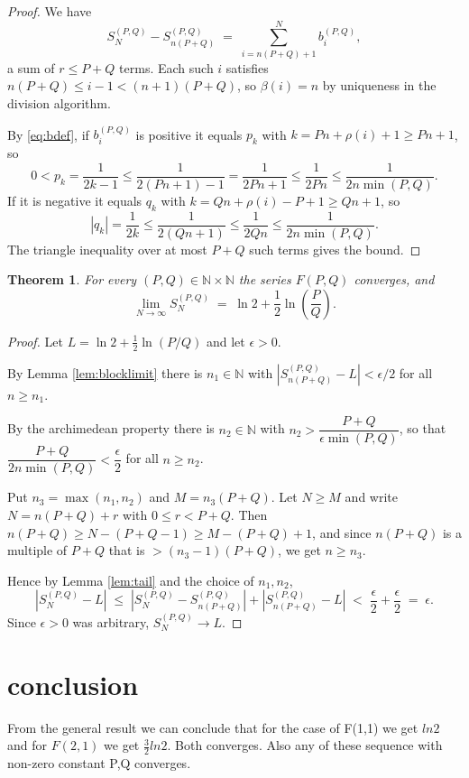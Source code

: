 \documentclass[11pt]{article}
\newtheorem{theorem}{Theorem}
\begin{document}
\begin{proof}
We have
\[
S_N^{(P,Q)} - S_{n(P+Q)}^{(P,Q)} \;=\; \sum_{i = n(P+Q)+1}^{N} b_i^{(P,Q)} ,
\]
a sum of $r \le P+Q$ terms. Each such $i$ satisfies $n(P+Q) \le i - 1 < (n+1)(P+Q)$,
so $\beta(i) = n$ by uniqueness in the division algorithm.

By \eqref{eq:bdef}, if $b_i^{(P,Q)}$ is positive it equals $p_k$ with
$k = Pn + \rho(i) + 1 \ge Pn+1$, so
\[
0 < p_k = \frac{1}{2k-1} \le \frac{1}{2(Pn+1)-1} = \frac{1}{2Pn+1}
\le \frac{1}{2Pn} \le \frac{1}{2n\min(P,Q)} .
\]
If it is negative it equals $q_k$ with $k = Qn + \rho(i) - P + 1 \ge Qn+1$, so
\[
\left| q_k \right| = \frac{1}{2k} \le \frac{1}{2(Qn+1)} \le \frac{1}{2Qn}
\le \frac{1}{2n\min(P,Q)} .
\]
The triangle inequality over at most $P+Q$ such terms gives the bound.
\end{proof}

\begin{theorem}
For every $(P,Q) \in \mathbb{N} \times \mathbb{N}$ the series $F(P,Q)$ converges, and
\[
\lim_{N \to \infty} S_N^{(P,Q)} \;=\; \ln 2 + \frac{1}{2}\ln\!\left(\frac{P}{Q}\right).
\]
\end{theorem}

\begin{proof}
Let $L = \ln 2 + \frac{1}{2}\ln(P/Q)$ and let $\epsilon > 0$.

By Lemma \ref{lem:blocklimit} there is $n_1 \in \mathbb{N}$ with
$\left| S_{n(P+Q)}^{(P,Q)} - L \right| < \epsilon/2$ for all $n \ge n_1$.

By the archimedean property there is $n_2 \in \mathbb{N}$ with
$n_2 > \dfrac{P+Q}{\epsilon \min(P,Q)}$, so that
$\dfrac{P+Q}{2n\min(P,Q)} < \dfrac{\epsilon}{2}$ for all $n \ge n_2$.

Put $n_3 = \max(n_1, n_2)$ and $M = n_3(P+Q)$. Let $N \ge M$ and write
$N = n(P+Q) + r$ with $0 \le r < P+Q$. Then $n(P+Q) \ge N - (P+Q-1) \ge M - (P+Q) + 1$,
and since $n(P+Q)$ is a multiple of $P+Q$ that is $> (n_3 - 1)(P+Q)$, we get
$n \ge n_3$.

Hence by Lemma \ref{lem:tail} and the choice of $n_1, n_2$,
\[
\left| S_N^{(P,Q)} - L \right|
\;\le\; \left| S_N^{(P,Q)} - S_{n(P+Q)}^{(P,Q)} \right|
+ \left| S_{n(P+Q)}^{(P,Q)} - L \right|
\;<\; \frac{\epsilon}{2} + \frac{\epsilon}{2} \;=\; \epsilon .
\]
Since $\epsilon > 0$ was arbitrary, $S_N^{(P,Q)} \to L$.
\end{proof}

\medskip
\noindent

\section{conclusion}
From the general result we can conclude that for the case of F(1,1) we get $ln2$ and for $F(2,1)$ we get $\frac{3}{2}ln2$. Both converges. Also any of these sequence with non-zero constant P,Q converges.
\end{document}
